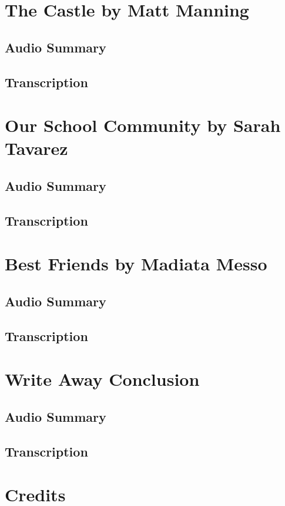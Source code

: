 \section{The Castle by Matt Manning}

\subsection{Audio Summary}

\subsection{Transcription}

\section{Our School Community by Sarah Tavarez}

\subsection{Audio Summary}

\subsection{Transcription}

\section{Best Friends by Madiata Messo}

\subsection{Audio Summary}

\subsection{Transcription}

\section{Write Away Conclusion}

\subsection{Audio Summary}

\subsection{Transcription}

\section{Credits}